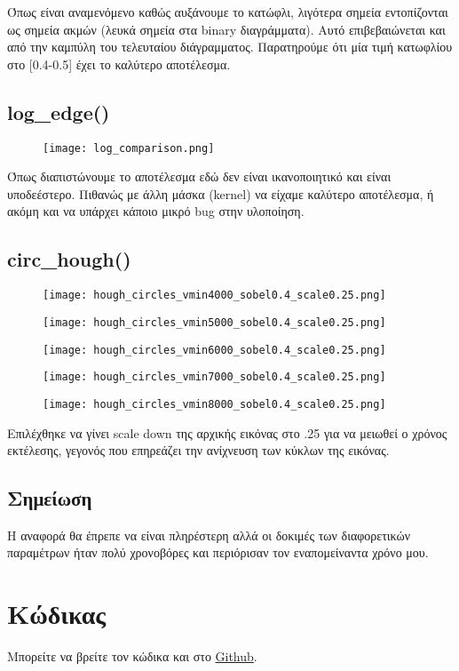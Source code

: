 \documentclass{article}
\begin{document}
Όπως είναι αναμενόμενο καθώς αυξάνουμε το κατώφλι, λιγότερα σημεία εντοπίζονται ως σημεία ακμών (λευκά σημεία στα binary διαγράμματα). Αυτό επιβεβαιώνεται και από την καμπύλη του τελευταίου διάγραμματος. Παρατηρούμε ότι μία τιμή κατωφλίου στο [0.4-0.5] έχει το καλύτερο αποτέλεσμα.

\subsection{log\_edge()}
\begin{figure}[H]
  \centering
  \texttt{[image: log\_comparison.png]}
  \label{fig:LoG}
\end{figure}

Όπως διαπιστώνουμε το αποτέλεσμα εδώ δεν είναι ικανοποιητικό και είναι υποδεέστερο. Πιθανώς με άλλη μάσκα (kernel) να είχαμε καλύτερο αποτέλεσμα, ή ακόμη και να υπάρχει κάποιο μικρό bug στην υλοποίηση.

\subsection{circ\_hough()}
\begin{figure}[H]
  \centering
  \texttt{[image: hough\_circles\_vmin4000\_sobel0.4\_scale0.25.png]}
  \label{fig:hough_vmin4000}
\end{figure}

\begin{figure}[H]
  \centering
  \texttt{[image: hough\_circles\_vmin5000\_sobel0.4\_scale0.25.png]}
  \label{fig:hough_vmin5000}
\end{figure}

\begin{figure}[H]
  \centering
  \texttt{[image: hough\_circles\_vmin6000\_sobel0.4\_scale0.25.png]}
  \label{fig:hough_vmin6000}
\end{figure}

\begin{figure}[H]
  \centering
  \texttt{[image: hough\_circles\_vmin7000\_sobel0.4\_scale0.25.png]}
  \label{fig:hough_vmin7000}
\end{figure}

\begin{figure}[H]
  \centering
  \texttt{[image: hough\_circles\_vmin8000\_sobel0.4\_scale0.25.png]}
  \label{fig:hough_vmin8000}
\end{figure}

Επιλέχθηκε να γίνει scale down της αρχικής εικόνας στο .25 για να μειωθεί ο χρόνος εκτέλεσης, γεγονός που επηρεάζει την ανίχνευση των κύκλων της εικόνας.

\subsection{Σημείωση}
Η αναφορά θα έπρεπε να είναι πληρέστερη αλλά οι δοκιμές των διαφορετικών παραμέτρων ήταν πολύ χρονοβόρες και περιόρισαν τον εναπομείναντα χρόνο μου. 

\section{Κώδικας}
Μπορείτε να βρείτε τον κώδικα και στο \href{https://github.com/charisvt/dip-hw2}{Github}.
\end{document}
